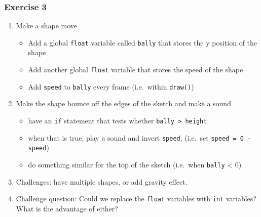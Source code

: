 \documentclass[ignorenonframetext,]{beamer}
\begin{document}
\begin{frame}[fragile]\frametitle{Exercise 3}

\begin{enumerate}[1.]
\item
  Make a shape move

  \begin{itemize}
  \item
    Add a global \texttt{float} variable called \texttt{bally} that
    stores the y position of the shape
  \item
    Add another global \texttt{float} variable that stores the speed of
    the shape
  \item
    Add \texttt{speed} to \texttt{bally} every frame (i.e.~within
    \texttt{draw()})
  \end{itemize}
\item
  Make the shape bounce off the edges of the sketch and make a sound

  \begin{itemize}
  \item
    have an \texttt{if} statement that tests whether
    \texttt{bally \textgreater{} height}
  \item
    when that is true, play a sound and invert \texttt{speed}, (i.e.~set
    \texttt{speed = 0 - speed})
  \item
    do something similar for the top of the sketch (i.e.~when
    \texttt{bally} \textless{} 0)
  \end{itemize}
\item
  Challenges: have multiple shapes, or add gravity effect.
\item
  Challenge question: Could we replace the \texttt{float} variables with
  \texttt{int} variables? What is the advantage of either?
\end{enumerate}

\end{frame}
\end{document}
